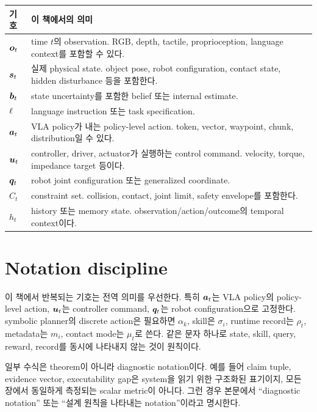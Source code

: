 \begin{center}
\small
\begin{tabularx}{\textwidth}{@{}p{}p{}@{}}
\toprule
기호 & 이 책에서의 의미 \\
\midrule
$\bm{o}_t$ & time $t$의 observation. RGB, depth, tactile, proprioception, language context를 포함할 수 있다. \\
$\bm{s}_t$ & 실제 physical state. object pose, robot configuration, contact state, hidden disturbance 등을 포함한다. \\
$\bm{b}_t$ & state uncertainty를 포함한 belief 또는 internal estimate. \\
$\ell$ & language instruction 또는 task specification. \\
$\bm{a}_t$ & VLA policy가 내는 policy-level action. token, vector, waypoint, chunk, distribution일 수 있다. \\
$\bm{u}_t$ & controller, driver, actuator가 실행하는 control command. velocity, torque, impedance target 등이다. \\
$\bm{q}_t$ & robot joint configuration 또는 generalized coordinate. \\
$C_t$ & constraint set. collision, contact, joint limit, safety envelope를 포함한다. \\
$h_t$ & history 또는 memory state. observation/action/outcome의 temporal context이다. \\
\bottomrule
\end{tabularx}
\end{center}

\section*{Notation discipline}

이 책에서 반복되는 기호는 전역 의미를 우선한다. 특히 $\bm{a}_t$는 VLA policy의 policy-level action, $\bm{u}_t$는 controller command, $\bm{q}_t$는 robot configuration으로 고정한다. symbolic planner의 discrete action은 필요하면 $\alpha_k$, skill은 $\sigma_i$, runtime record는 $\rho_t$, metadata는 $m_i$, contact mode는 $\mu_t$로 쓴다. 같은 문자 하나로 state, skill, query, reward, record를 동시에 나타내지 않는 것이 원칙이다.

일부 수식은 theorem이 아니라 diagnostic notation이다. 예를 들어 claim tuple, evidence vector, executability gap은 system을 읽기 위한 구조화된 표기이지, 모든 장에서 동일하게 측정되는 scalar metric이 아니다. 그런 경우 본문에서 ``diagnostic notation'' 또는 ``설계 원칙을 나타내는 notation''이라고 명시한다.

